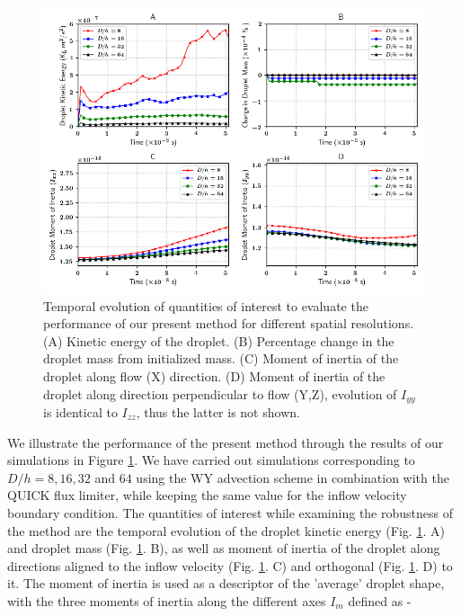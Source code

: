 \vspace*{0.2cm}

\begin{figure}[h!]
\begin{center}
\includegraphics[scale = 0.6]{Figures/Sagar/multiplot_raindrop.png}
\end{center}
\vspace*{-0.5cm}
	\caption{Temporal evolution of quantities of interest to evaluate the performance of our present method for different spatial resolutions. (A) Kinetic energy of the droplet. (B) Percentage change in the droplet mass from initialized mass. (C) Moment of inertia of the droplet along flow (X) direction. (D) Moment of inertia of the droplet along direction perpendicular to flow (Y,Z), evolution of $I_{yy}$ is identical to $I_{zz}$, thus the latter is not shown.}
\label{multi}
\end{figure}

We illustrate the performance of the present method through the results of our simulations in Figure \ref{multi}. We have carried out simulations corresponding to $D/h = 8, 16, 32 $ and $64$ using the WY advection scheme in combination with the QUICK flux limiter, while keeping the same value for the inflow velocity boundary condition. The quantities of interest while examining the robustness of the method are the temporal evolution of the droplet kinetic energy (Fig. \ref{multi}. A) and droplet mass (Fig. \ref{multi}. B), as well as moment of inertia of the droplet along directions aligned to the inflow velocity (Fig. \ref{multi}. C) and orthogonal (Fig. \ref{multi}. D) to it. The moment of inertia is used as a descriptor of the 'average' droplet shape, with the three moments of inertia along the different axes $I_m$ defined as - 

